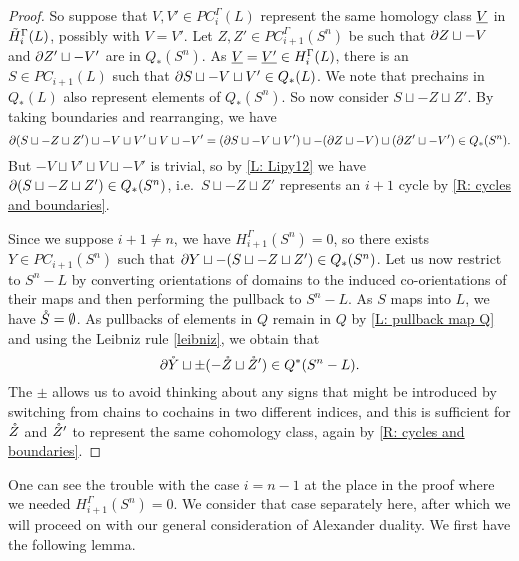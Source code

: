 \begin{example}
\begin{proof}
So suppose that $V,V' \in PC_i^\Gamma(L)$ represent the same homology class $\underline{V}$ in $\tilde H_i^\Gamma(L)$, possibly with $V = V'$.
Let $Z,Z' \in PC_{i+1}^\Gamma(S^n)$ be such that $\partial Z \sqcup -V$ and $\partial Z' \sqcup -V'$ are in $Q_*(S^n)$.
As $\underline{V}=\underline{V'} \in H_i^\Gamma(L)$, there is an $S \in PC_{i+1}(L)$ such that $\partial S \sqcup -V \sqcup V' \in Q_*(L)$.
We note that prechains in $Q_*(L)$ also represent elements of $Q_*(S^n)$.
So now consider $S \sqcup -Z \sqcup Z'$.
By taking boundaries and rearranging, we have $$\partial (S \sqcup -Z \sqcup Z')\sqcup -V \sqcup V' \sqcup V \sqcup -V' = (\partial S \sqcup -V \sqcup V')\sqcup -(\partial Z \sqcup -V) \sqcup (\partial Z'\sqcup -V')\in Q_*(S^n).$$
But  $-V \sqcup V' \sqcup V \sqcup -V'$ is trivial, so by \cref{L: Lipy12} we have $\partial(S \sqcup -Z \sqcup Z')\in Q_*(S^n)$, i.e.\ $S \sqcup -Z \sqcup Z'$ represents an $i+1$ cycle by \cref{R: cycles and boundaries}.

Since we suppose $i+1\neq n$, we have $H_{i+1}^\Gamma(S^n) = 0$, so there exists $Y \in PC_{i+1}(S^n)$ such that $\partial Y \sqcup -(S \sqcup -Z \sqcup Z') \in Q_*(S^n)$.
Let us now restrict to $S^n-L$ by converting orientations of domains to the induced co-orientations of their maps and then performing the pullback to $S^n-L$.
As $S$ maps into $L$, we have $\mathring{S} = \emptyset$.
As pullbacks of elements in $Q$ remain in $Q$ by \cref{L: pullback map Q} and using the Leibniz rule \cref{leibniz}, we obtain that $$\partial \mathring{Y} \sqcup \pm (-\mathring{Z} \sqcup \mathring{Z}') \in Q^*(S^n-L).$$
The $\pm$ allows us to avoid thinking about any signs that might be introduced by switching from chains to cochains in two different indices, and this is sufficient for $\mathring{Z}$ and $\mathring{Z}'$ to represent the same cohomology class, again by \cref{R: cycles and boundaries}.
\end{proof}

One can see the trouble with the case $i = n-1$ at the place in the proof where we needed $H_{i+1}^\Gamma (S^n) = 0$.
We consider that case separately here, after which we will proceed on with our general consideration of Alexander duality.
We first have the following lemma.


\end{example}
